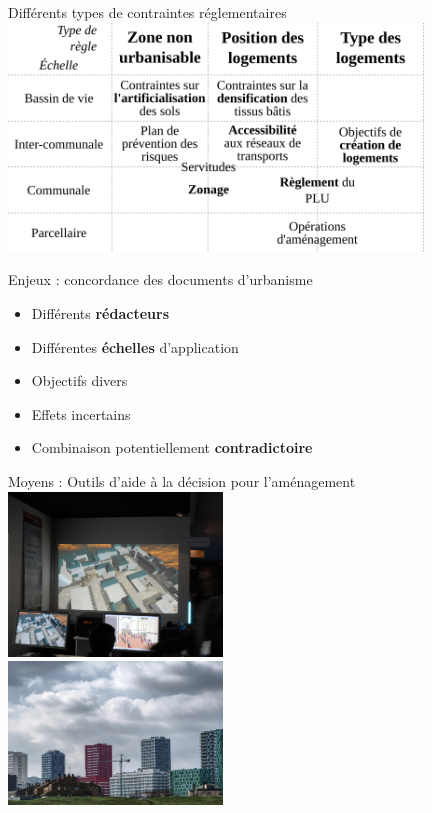 \documentclass[xcolor=table]{beamer}
\begin{document}
\begin{frame}{Différents types de contraintes réglementaires} 
	\includegraphics[width=11cm]{Images/synthese-doc.png}	
\end{frame}


\begin{frame}{Enjeux : concordance des documents d'urbanisme}
	\begin{itemize}
		\item Différents \textbf{rédacteurs}
		\item Différentes \textbf{échelles} d'application
		\item Objectifs divers
		\item Effets incertains 
		\item Combinaison potentiellement \textbf{contradictoire}
	\end{itemize}
\end{frame}

\begin{frame}{Moyens : Outils d'aide à la décision pour l'aménagement}
	\centering
	\includegraphics[width=5.7cm]{Images/bureau.jpg}	
	\\
	\includegraphics[width=5.7cm]{Images/simcity.jpg}	
\end{frame}
\end{document}
